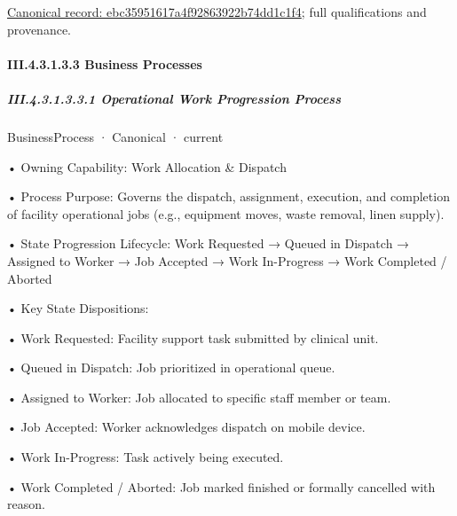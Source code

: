 {\footnotesize \href{../../../../../../../continuum/business/business-function/ebc35951617a4f92863922b74dd1c1f4.md}{Canonical record: ebc35951617a4f92863922b74dd1c1f4}; full qualifications and provenance.}\par
\paragraph*{III.4.3.1.3.3 Business Processes}
\label{navigation:III.4.3.1.3.3}

\subparagraph*{III.4.3.1.3.3.1 Operational Work Progression Process}
\label{navigation:III.4.3.1.3.3.1}

\label{element:5ebba522194b4de5a5b3963e855d712d}
{\small BusinessProcess · Canonical · current}\par

•
Owning Capability: Work Allocation \& Dispatch



•
Process Purpose: Governs the dispatch, assignment, execution, and completion of facility operational jobs (e.g., equipment moves, waste removal, linen supply).



•
State Progression Lifecycle: Work Requested → Queued in Dispatch → Assigned to Worker → Job Accepted → Work In-Progress → Work Completed / Aborted



•
Key State Dispositions:



•
Work Requested: Facility support task submitted by clinical unit.



•
Queued in Dispatch: Job prioritized in operational queue.



•
Assigned to Worker: Job allocated to specific staff member or team.



•
Job Accepted: Worker acknowledges dispatch on mobile device.



•
Work In-Progress: Task actively being executed.



•
Work Completed / Aborted: Job marked finished or formally cancelled with reason.



